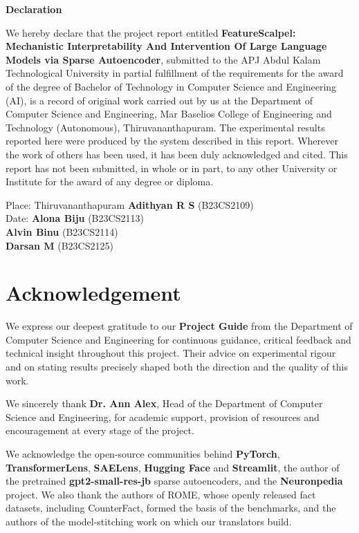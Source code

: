 \documentclass[12pt,a4paper]{report}
\newcommand{\projecttitle}{FeatureScalpel: Mechanistic Interpretability And Intervention Of Large Language Models via Sparse Autoencoder}
\begin{document}
\thispagestyle{empty}
\begin{center}{\LARGE\bfseries Declaration\par}\end{center}
\vspace{1cm}
We hereby declare that the project report entitled \textbf{\projecttitle}, submitted to the APJ Abdul Kalam Technological University in partial fulfillment of the requirements for the award of the degree of Bachelor of Technology in Computer Science and Engineering (AI), is a record of original work carried out by us at the Department of Computer Science and Engineering, Mar Baselios College of Engineering and Technology (Autonomous), Thiruvananthapuram. The experimental results reported here were produced by the system described in this report. Wherever the work of others has been used, it has been duly acknowledged and cited. This report has not been submitted, in whole or in part, to any other University or Institute for the award of any degree or diploma.

\vspace{2.5cm}
\noindent Place: Thiruvananthapuram \hfill \textbf{Adithyan R S} (B23CS2109)\\
Date: \hfill \textbf{Alona Biju} (B23CS2113)\\
\mbox{} \hfill \textbf{Alvin Binu} (B23CS2114)\\
\mbox{} \hfill \textbf{Darsan M} (B23CS2125)
\clearpage

\setcounter{page}{1}

\chapter*{\centering Acknowledgement}
We express our deepest gratitude to our \textbf{Project Guide} from the Department of Computer Science and Engineering for continuous guidance, critical feedback and technical insight throughout this project. Their advice on experimental rigour and on stating results precisely shaped both the direction and the quality of this work.

We sincerely thank \textbf{Dr. Ann Alex}, Head of the Department of Computer Science and Engineering, for academic support, provision of resources and encouragement at every stage of the project.

We acknowledge the open-source communities behind \textbf{PyTorch}, \textbf{TransformerLens}, \textbf{SAELens}, \textbf{Hugging Face} and \textbf{Streamlit}, the author of the pretrained \textbf{gpt2-small-res-jb} sparse autoencoders, and the \textbf{Neuronpedia} project. We also thank the authors of ROME, whose openly released fact datasets, including CounterFact, formed the basis of the benchmarks, and the authors of the model-stitching work on which our translators build.
\end{document}
